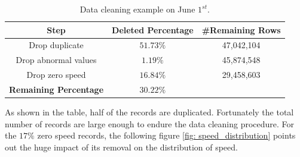 \begin{table}[htb]
  \begin{center}
      \caption{Data cleaning example on June $1^{st}$.}
      \label{data_cleaning_table}
      \begin{tabular}{ccc}
          \toprule

          \textbf{Step} & \textbf{Deleted Percentage} & \textbf{\#Remaining Rows}\\

          \midrule

          Drop duplicate & $51.73\%$ & 47,042,104\\
          Drop abnormal values & $1.19\%$ & 45,874,548\\
          Drop zero speed & $16.84\%$ & 29,458,603\\

          \cmidrule{1-2}

          \textbf{Remaining Percentage} & $30.22\%$ & ~\\

          \bottomrule
      \end{tabular}
  \end{center}
\end{table}

As shown in the table, half of the records are duplicated. Fortunately the total number of records are large enough to endure the data cleaning procedure. For the $17\%$ zero speed records, the following figure \ref{fig: speed_distribution} points out the huge impact of its removal on the distribution of speed.

